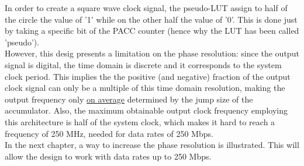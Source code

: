 \documentclass[11pt]{article}
\renewcommand{\>}{\rangle} \renewcommand{\emptyset}{\varnothing}
\begin{document}
In order to create a square wave clock signal, the pseudo-LUT assign to half of
the circle the value of '1' while on the other half the value of '0'. This is
done just by taking a specific bit of the PACC counter (hence why the LUT has
been called 'pseudo').\\
However, this desig presents a limitation on the phase resolution: since the
output signal is digital, the time domain is discrete and it corresponds to the
system clock period. This implies the the positive (and negative) fraction of
the output clock signal can only be a multiple of this time domain resolution,
making the output frequency only \underline{on average} determined by the jump
size of the accumulator. Also, the maximum obtainable output clock frequency
employing this architecture is half of the system clock, which makes it hard to
reach a frequency of 250 MHz, needed for data rates of 250 Mbps.\\
In the next chapter, a way to increase the phase resolution is illustrated. This
will allow the design to work with data rates up to 250 Mbps.\\
\end{document}
